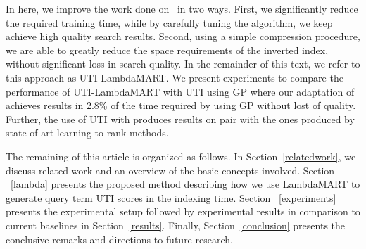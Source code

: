 \documentclass[preprint,review,10pt,3p]{elsarticle}
\begin{document}
In here, we improve the work done on \lepref\ in two ways. First, we significantly reduce the required training time, while by carefully tuning the algorithm, we keep achieve high quality search results. Second, using a simple compression procedure, we are able to greatly reduce the space requirements of the inverted index, without significant loss in search quality. In the remainder of this text, we refer to this approach as UTI-LambdaMART. We present experiments to compare the performance of UTI-LambdaMART with UTI using GP where  our adaptation of \lambdamart achieves results in 2.8\% of the time required by \lepref using GP without lost of quality. Further, the use of UTI with \lambdamart produces results on pair with the ones produced by state-of-art learning to rank methods.








The remaining  of this article is organized as follows. In Section~\ref{relatedwork}, we discuss related work and an overview of the basic concepts involved. Section ~\ref{lambda} presents the proposed method describing how we use LambdaMART to generate query term UTI scores in the indexing time. Section ~\ref{experiments} presents the experimental setup followed by experimental results in comparison to current baselines in Section~\ref{results}. Finally, Section~\ref{conclusion} presents the conclusive remarks and directions to future research.
\end{document}
